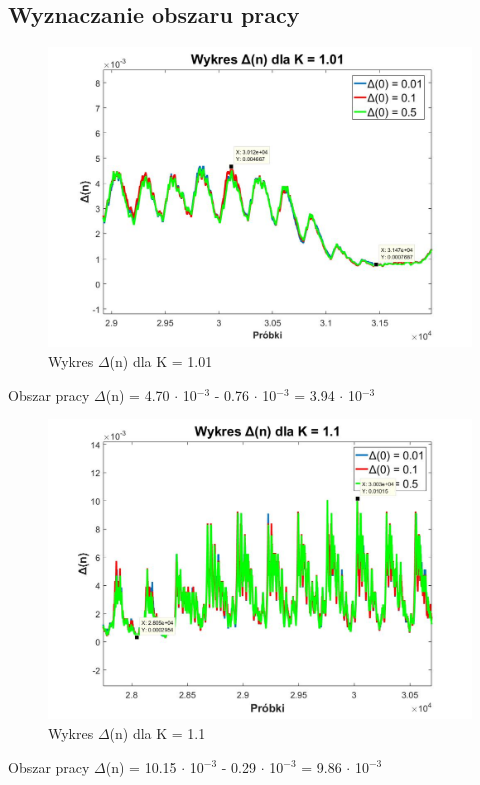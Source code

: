 \documentclass[12pt, a4paper, oneside]{article}
\begin{document}
\subsection{Wyznaczanie obszaru pracy}
\begin{figure}[h]
\centering
\caption{Wykres $\Delta$(n) dla K = 1.01}
\includegraphics[scale=0.33]{f5.jpg}
\end{figure}
\begin{center}
Obszar pracy $\Delta$(n) = 4.70 $\cdot$ 10$^{-3}$ - 0.76 $\cdot$ 10$^{-3}$ = 3.94 $\cdot$ 10$^{-3}$
\end{center}
\begin{figure}[h]
\centering
\caption{Wykres $\Delta$(n) dla K = 1.1}
\includegraphics[scale=0.33]{f6.jpg}
\end{figure}
\begin{center}
Obszar pracy $\Delta$(n) = 10.15 $\cdot$ 10$^{-3}$ - 0.29 $\cdot$ 10$^{-3}$ = 9.86 $\cdot$ 10$^{-3}$
\end{center}
\end{document}
